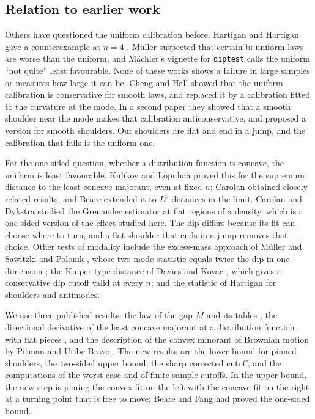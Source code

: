 \subsection{Relation to earlier work}
Others have questioned the uniform calibration before. Hartigan and Hartigan gave a counterexample at $n=4$ \cite[p.~73]{HH85}. Müller \cite{Mueller92} suspected that certain bi-uniform laws are worse than the uniform, and Mächler's vignette for \texttt{diptest} calls the uniform ``not quite'' least favourable. None of these works shows a failure in large samples or measures how large it can be. Cheng and Hall \cite{CH98} showed that the uniform calibration is conservative for smooth laws, and replaced it by a calibration fitted to the curvature at the mode. In a second paper \cite{CH99} they showed that a smooth shoulder near the mode makes that calibration anticonservative, and proposed a version for smooth shoulders. Our shoulders are flat and end in a jump, and the calibration that fails is the uniform one.

For the one-sided question, whether a distribution function is concave, the uniform is least favourable. Kulikov and Lopuhaä \cite{KL08} proved this for the supremum distance to the least concave majorant, even at fixed $n$; Carolan \cite{Carolan02} obtained closely related results, and Beare \cite{Beare21} extended it to $L^p$ distances in the limit. Carolan and Dykstra \cite{CD99} studied the Grenander estimator at flat regions of a density, which is a one-sided version of the effect studied here. The dip differs because its fit can choose where to turn, and a flat shoulder that ends in a jump removes that choice. Other tests of modality include the excess-mass approach of Müller and Sawitzki \cite{MS91} and Polonik \cite{Polonik95}, whose two-mode statistic equals twice the dip in one dimension \cite{CH98}; the Kuiper-type distance of Davies and Kovac \cite{DK04}, which gives a conservative dip cutoff valid at every $n$; and the statistic of Hartigan \cite{Hartigan00} for shoulders and antimodes.

We use three published results: the law of the gap $M$ and its tables \cite{BP11,BF11}, the directional derivative of the least concave majorant at a distribution function with flat pieces \cite{BF17}, and the description of the convex minorant of Brownian motion by Pitman and Uribe Bravo \cite{PUB12}. The new results are the lower bound for pinned shoulders, the two-sided upper bound, the sharp corrected cutoff, and the computations of the worst case and of finite-sample cutoffs. In the upper bound, the new step is joining the convex fit on the left with the concave fit on the right at a turning point that is free to move; Beare and Fang \cite{BF17} had proved the one-sided bound.

